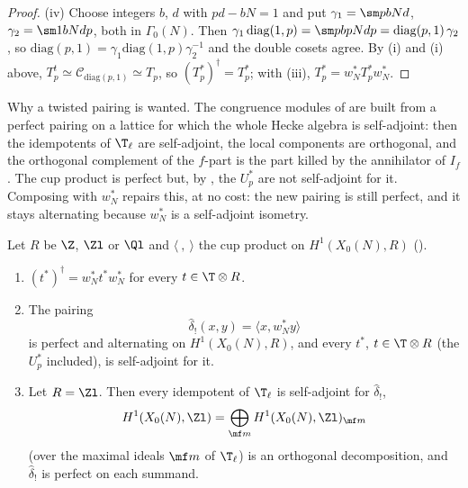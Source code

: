 \begin{proof}
(iv) Choose integers $b$, $d$ with $pd-bN=1$ and put $\gamma_1=\sm pbNd$, $\gamma_2=\sm1bN{dp}$, both in $\Gamma_0(N)$. Then
$\gamma_1\,\mathrm{diag}(1,p)=\sm p{bp}N{dp}=\mathrm{diag}(p,1)\,\gamma_2$, so $\mathrm{diag}(p,1)=\gamma_1\mathrm{diag}(1,p)\gamma_2^{-1}$ and the double cosets agree. By
(i) and (i) above, $T_p^t\simeq\mathcal C_{\mathrm{diag}(p,1)}\simeq T_p$, so $(T_p^*)^\dagger=T_p^*$; with (iii), $T_p^*=w_N^*T_p^*w_N^*$.
\end{proof}

Why a twisted pairing is wanted. The congruence modules of  are built from a perfect pairing on a lattice for which the whole Hecke algebra is self-adjoint: then
the idempotents of $\T_\ell$ are self-adjoint, the local components are orthogonal, and the orthogonal complement of the $f$-part is the part killed by the annihilator of $I_f$. The cup
product is perfect but, by , the $U_p^*$ are not self-adjoint for it. Composing with $w_N^*$ repairs this, at no cost: the new pairing is still perfect,
and it stays alternating because $w_N^*$ is a self-adjoint isometry.

\begin{corollary}\label{cor:moddeg:delta-hat}
Let $R$ be $\Z$, $\Zl$ or $\Ql$ and $\langle\ ,\ \rangle$ the cup product on $H^1(X_0(N),R)$ ().
\begin{enumerate}[label=(\roman*)]
\item $(t^*)^\dagger=w_N^*t^*w_N^*$ for every $t\in\T\otimes R$.
\item The pairing
\[
\hat\delta_!(x,y)=\langle x,w_N^*y\rangle
\]
is perfect and alternating on $H^1(X_0(N),R)$, and every $t^*$, $t\in\T\otimes R$ (the $U_p^*$ included), is self-adjoint for it.
\item Let $R=\Zl$. Then every idempotent of $\T_\ell$ is self-adjoint for $\hat\delta_!$,
\[H^1(X_0(N),\Zl)=\bigoplus_{\mf m}H^1(X_0(N),\Zl)_{\mf m}\]
(over the maximal ideals $\mf m$ of $\T_\ell$) is an orthogonal decomposition, and $\hat\delta_!$ is perfect on each summand.
\end{enumerate}
\end{corollary}


